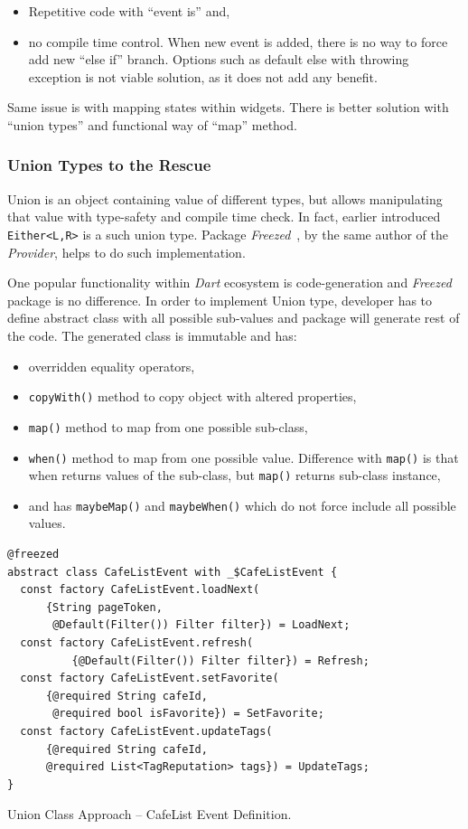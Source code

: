\begin{itemize}
    \item Repetitive code with ``event is'' and,
    \item no compile time control. When new event is added, there is no way to force add new ``else if'' branch. Options such as default else with throwing exception is not viable solution, as it does not add any benefit.
\end{itemize}

Same issue is with mapping states within widgets. There is better solution with ``union types'' and functional way of ``map'' method.

\subsubsection{Union Types to the Rescue}
Union is an object containing value of different types, but allows manipulating that value with type-safety and compile time check. In fact, earlier introduced \verb|Either<L,R>| is a such union type. Package \textit{Freezed}~\cite{package-freezed}, by the same author of the \textit{Provider}, helps to do such implementation. 

One popular functionality within \textit{Dart} ecosystem is code-generation and \textit{Freezed} package is no difference. In order to implement Union type, developer has to define abstract class with all possible sub-values and package will generate rest of the code. The generated class is immutable and has:

\begin{itemize}
    \item overridden equality operators,
    \item \verb|copyWith()| method to copy object with altered properties, 
    \item \verb|map()| method to map from one possible sub-class,
    \item \verb|when()| method to map from one possible value. Difference with \verb|map()|  is that when returns values of the sub-class, but \verb|map()| returns sub-class instance,
    \item and has \verb|maybeMap()| and \verb|maybeWhen()| which do not force include all possible values. 
\end{itemize}

\begin{listing}[ht]
\begin{verbatim}
@freezed
abstract class CafeListEvent with _$CafeListEvent {
  const factory CafeListEvent.loadNext(
      {String pageToken, 
       @Default(Filter()) Filter filter}) = LoadNext;
  const factory CafeListEvent.refresh(
          {@Default(Filter()) Filter filter}) = Refresh;
  const factory CafeListEvent.setFavorite(
      {@required String cafeId, 
       @required bool isFavorite}) = SetFavorite;
  const factory CafeListEvent.updateTags(
      {@required String cafeId,
      @required List<TagReputation> tags}) = UpdateTags;
}
\end{verbatim}
\caption{Union Class Approach -- CafeList Event Definition.}
\label{listing:ct-event-union}
\end{listing}

